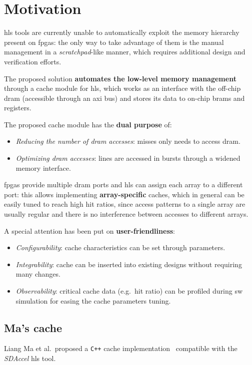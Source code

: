 \documentclass[11pt,a4paper,oneside]{memoir}
\begin{document}
\chapter{Motivation}
\ac{hls} tools are currently unable to automatically exploit the memory
hierarchy present on \acp{fpga}: the only way to take advantage of
them is the manual management in a \emph{scratchpad}-like manner, which
requires additional design and verification efforts.

The proposed solution \textbf{automates the low-level memory management}
through a cache module for \ac{hls}, which works as an interface with the
off-chip \ac{dram} (accessible through an \ac{axi} bus) and stores its data to
on-chip \acp{bram} and registers.

\bigskip
The proposed cache module has the \textbf{dual purpose} of:
\begin{itemize}
	\item \emph{Reducing the number of \ac{dram} accesses}: misses only
		needs to access \ac{dram}.
	\item \emph{Optimizing \ac{dram} accesses}: lines are accessed in
		bursts through a widened memory interface.
\end{itemize}

\acp{fpga} provide multiple \ac{dram} ports and \ac{hls} can assign each array
to a different port: this allows implementing \textbf{array-specific} caches,
which in general can be easily tuned to reach high hit ratios, since access
patterns to a single array are usually regular and there is no interference
between accesses to different arrays.

\bigskip
A special attention has been put on \textbf{user-friendliness}:
\begin{itemize}
	\item \emph{Configurability}: cache characteristics can be set through
		parameters.
	\item \emph{Integrability}: cache can be inserted into existing designs
		without requiring many changes.
	\item \emph{Observability}: critical cache data (e.g.\ hit ratio) can
		be profiled during \ac{sw} simulation for easing the cache
		parameters tuning.
\end{itemize}

\section{Ma's cache}
Liang Ma et al.\ proposed a \texttt{C++} cache implementation~\cite{liang}
compatible with the \emph{SDAccel\texttrademark} \ac{hls} tool.
\end{document}
